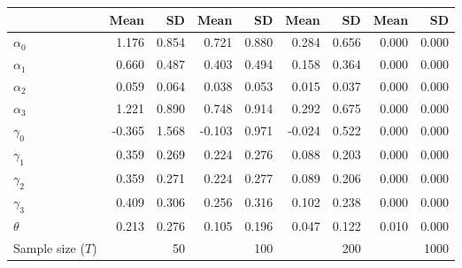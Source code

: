 
\begin{tabular}[t]{lrrrrrrrr}
\toprule
  & Mean & SD & Mean  & SD  & Mean   & SD   & Mean    & SD   \\
\midrule
$\alpha_{0}$ & 1.176 & 0.854 & 0.721 & 0.880 & 0.284 & 0.656 & 0.000 & 0.000\\
$\alpha_{1}$ & 0.660 & 0.487 & 0.403 & 0.494 & 0.158 & 0.364 & 0.000 & 0.000\\
$\alpha_{2}$ & 0.059 & 0.064 & 0.038 & 0.053 & 0.015 & 0.037 & 0.000 & 0.000\\
$\alpha_{3}$ & 1.221 & 0.890 & 0.748 & 0.914 & 0.292 & 0.675 & 0.000 & 0.000\\
$\gamma_{0}$ & -0.365 & 1.568 & -0.103 & 0.971 & -0.024 & 0.522 & 0.000 & 0.000\\
$\gamma_{1}$ & 0.359 & 0.269 & 0.224 & 0.276 & 0.088 & 0.203 & 0.000 & 0.000\\
$\gamma_{2}$ & 0.359 & 0.271 & 0.224 & 0.277 & 0.089 & 0.206 & 0.000 & 0.000\\
$\gamma_{3}$ & 0.409 & 0.306 & 0.256 & 0.316 & 0.102 & 0.238 & 0.000 & 0.000\\
$\theta$ & 0.213 & 0.276 & 0.105 & 0.196 & 0.047 & 0.122 & 0.010 & 0.000\\
Sample size ($T$) &  & 50 &  & 100 &  & 200 &  & 1000\\
\bottomrule
\end{tabular}
